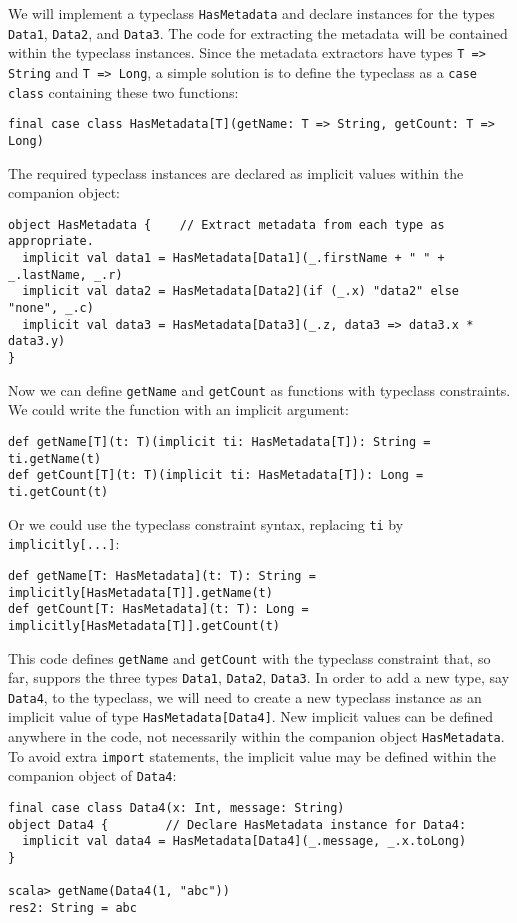 We will implement a typeclass \lstinline!HasMetadata! and declare
instances for the types \lstinline!Data1!, \lstinline!Data2!, and
\lstinline!Data3!. The code for extracting the metadata will be contained
within the typeclass instances. Since the metadata extractors have
types \lstinline!T => String! and \lstinline!T => Long!, a simple
solution is to define the typeclass as a \lstinline!case class! containing
these two functions:
\begin{lstlisting}
final case class HasMetadata[T](getName: T => String, getCount: T => Long)
\end{lstlisting}
The required typeclass instances are declared as implicit values within
the companion object:
\begin{lstlisting}
object HasMetadata {    // Extract metadata from each type as appropriate.
  implicit val data1 = HasMetadata[Data1](_.firstName + " " + _.lastName, _.r)
  implicit val data2 = HasMetadata[Data2](if (_.x) "data2" else "none", _.c)
  implicit val data3 = HasMetadata[Data3](_.z, data3 => data3.x * data3.y)
}
\end{lstlisting}
Now we can define \lstinline!getName! and \lstinline!getCount! as
functions with typeclass constraints. We could write the function
with an implicit argument:
\begin{lstlisting}
def getName[T](t: T)(implicit ti: HasMetadata[T]): String = ti.getName(t)
def getCount[T](t: T)(implicit ti: HasMetadata[T]): Long = ti.getCount(t)
\end{lstlisting}
Or we could use the typeclass constraint syntax, replacing \lstinline!ti!
by \lstinline!implicitly[...]!:
\begin{lstlisting}
def getName[T: HasMetadata](t: T): String = implicitly[HasMetadata[T]].getName(t)
def getCount[T: HasMetadata](t: T): Long = implicitly[HasMetadata[T]].getCount(t)
\end{lstlisting}

This code defines \lstinline!getName! and \lstinline!getCount! with
the typeclass constraint that, so far, suppors the three types \lstinline!Data1!,
\lstinline!Data2!, \lstinline!Data3!. In order to add a new type,
say \lstinline!Data4!, to the typeclass, we will need to create a
new typeclass instance as an implicit value of type \lstinline!HasMetadata[Data4]!.
New implicit values can be defined anywhere in the code, not necessarily
within the companion object \lstinline!HasMetadata!. To avoid extra
\lstinline!import! statements, the implicit value may be defined
within the companion object of \lstinline!Data4!:
\begin{lstlisting}
final case class Data4(x: Int, message: String)
object Data4 {        // Declare HasMetadata instance for Data4:
  implicit val data4 = HasMetadata[Data4](_.message, _.x.toLong)
}

scala> getName(Data4(1, "abc"))
res2: String = abc
\end{lstlisting}

